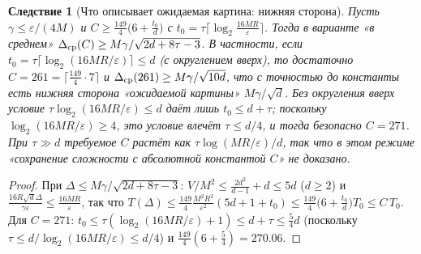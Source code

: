 \documentclass[11pt,a4paper]{article}
\numberwithin{equation}{section}
\newtheorem{corollary}[theorem]{Следствие}
\theoremstyle{definition}
\theoremstyle{remark}
\begin{document}
\begin{corollary}[Что описывает ожидаемая картина: нижняя сторона]\label{cor:cp}
Пусть $\gamma\le\varepsilon/(4M)$ и $C\ge\frac{149}4\big(6+\frac{t_0}d\big)$ с $t_0=\tau\lceil\log_2\frac{16MR}{\varepsilon}\rceil$. Тогда в варианте «в среднем» $\Delta_{\rm cp}(C)\ge M\gamma/\sqrt{2d+8\tau-3}$. В частности, если $t_0=\tau\lceil\log_2(16MR/\varepsilon)\rceil\le d$ (с округлением вверх), то достаточно $C=261=\lceil\frac{149}4\cdot7\rceil$ и $\Delta_{\rm cp}(261)\ge M\gamma/\sqrt{10d}$, что с точностью до константы есть нижняя сторона «ожидаемой картины» $M\gamma/\sqrt d$. Без округления вверх условие $\tau\log_2(16MR/\varepsilon)\le d$ даёт лишь $t_0\le d+\tau$; поскольку $\log_2(16MR/\varepsilon)\ge4$, это условие влечёт $\tau\le d/4$, и тогда безопасно $C=271$. При $\tau\gg d$ требуемое $C$ растёт как $\tau\log(MR/\varepsilon)/d$, так что в этом режиме «сохранение сложности с абсолютной константой $C$» \emph{не} доказано.
\end{corollary}
\begin{proof}
При $\Delta\le M\gamma/\sqrt{2d+8\tau-3}$: $V/M^2\le\frac{2d^2}{d-1}+d\le5d$ ($d\ge2$) и $\frac{16R\sqrt d\Delta}{\gamma\varepsilon}\le\frac{16MR}\varepsilon$, так что $T(\Delta)\le\frac{149}4\frac{M^2R^2}{\varepsilon^2}(5d+1+t_0)\le\frac{149}4\big(6+\frac{t_0}d\big)T_0\le C\,T_0$. Для $C=271$: $t_0\le\tau(\log_2(16MR/\varepsilon)+1)\le d+\tau\le\frac54d$ (поскольку $\tau\le d/\log_2(16MR/\varepsilon)\le d/4$) и $\frac{149}4(6+\frac54)=270.06$.
\end{proof}
\end{document}
